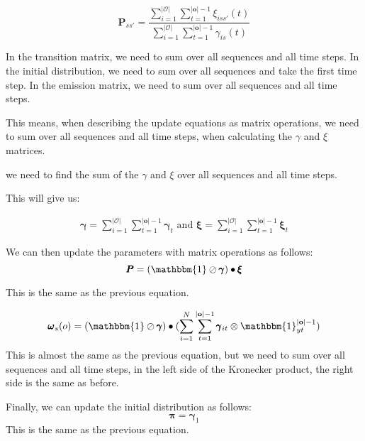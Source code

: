 \begin{equation}
    \pmb{P}_{s s'} = \frac{\sum_{i=1}^{|\mathcal{O}|} \sum_{t = 1}^{|\mathbf{o}|-1} \xi_{iss'}(t)}{\sum_{i=1}^{|\mathcal{O}|} \sum_{t = 1}^{|\mathbf{o}|-1} \gamma_{is}(t)}
\end{equation}

In the transition matrix, we need to sum over all sequences and all time steps.
In the initial distribution, we need to sum over all sequences and take the first time step.
In the emission matrix, we need to sum over all sequences and all time steps.

This means, when describing the update equations as matrix operations, we need to sum over all sequences and all time steps, when calculating the $\gamma$ and $\xi$ matrices.

we need to find the sum of the $\gamma$ and $\xi$ over all sequences and all time steps.

This will give us:

\begin{align}
    \pmb{\gamma} = \sum_{i=1}^{|\mathcal{O}|}\sum_{t=1}^{|\mathbf{o}|-1} \pmb{\gamma}_t
    \text{ and }
    \pmb{\xi} = \sum_{i=1}^{|\mathcal{O}|}\sum_{t=1}^{|\mathbf{o}|-1} \pmb{\xi}_t
\end{align}

We can then update the parameters with matrix operations as follows:
\begin{equation}
    \pmb{P}
    = (\mathbbm{1} \oslash \pmb{\gamma}) \bullet \pmb{\xi}
    \label{eq:transition-probabilities-update}
\end{equation}

This is the same as the previous equation.

\begin{equation}
    \pmb{\omega}
    _s(o) = (\mathbbm{1} \oslash \pmb{\gamma}) \bullet (\sum_{i=1}^N \sum_{t=1}^{|\mathbf{o}|-1} \pmb{\gamma}_{it} \otimes \mathbbm{1}_{yt}^{|\mathbf{o}|-1})
    \label{eq:omega-update}
\end{equation}
This is almost the same as the previous equation, but we need to sum over all sequences and all time steps, in the left side of the Kronecker product, the right side is the same as before.

Finally, we can update the initial distribution as follows:
\begin{equation}
    \pmb{\pi}
    = \pmb{\gamma}_1
    \label{eq:initial-probabilities-update}
\end{equation}
This is the same as the previous equation.



